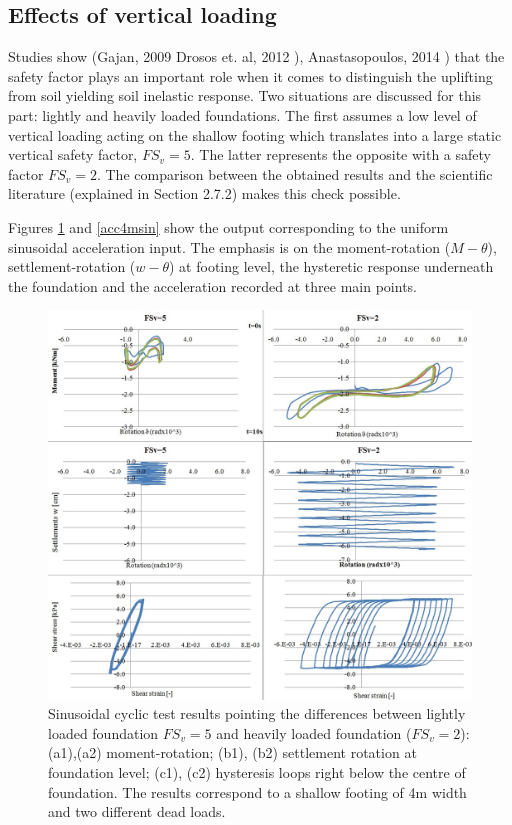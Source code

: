 \subsection{Effects of vertical loading}
Studies show (Gajan, 2009 \cite{gajan2009effects} Drosos et. al, 2012 \cite{drosos2012soil}), Anastasopoulos, 2014 \cite{anastasopoulos2014simplified}) that the safety factor plays an important role when it comes to distinguish the uplifting from soil yielding soil inelastic response. Two situations are discussed for this part: lightly and heavily loaded foundations. The first assumes a low level of vertical loading acting on the shallow footing which translates into a large static vertical safety factor, $FS_v=5$. The latter represents the opposite with a safety factor $FS_v=2.$ The comparison between the obtained results and the scientific literature (explained in Section 2.7.2) makes this check possible.

Figures \ref{sin} and \ref{acc4msin} show the output corresponding to the uniform sinusoidal \mbox{acceleration} input. The emphasis is on the moment-rotation ($M-\theta$), settlement-rotation ($w-\theta$) at footing level, the hysteretic response underneath the foundation and the acceleration recorded at three main points.

\begin{figure}
		\centering
		\includegraphics[width=0.7\linewidth]{"sin_4m"}
		\caption{Sinusoidal cyclic test results pointing the \mbox{differences} between lightly loaded foundation $FS_v=5$ and heavily loaded foundation ($FS_v=2$): (a1),(a2) moment-rotation; (b1), (b2) settlement rotation at foundation level; (c1), (c2) hysteresis loops right below the centre of foundation. The results correspond to a shallow footing of 4m width and two different dead loads.}
		\label{sin}
\end{figure}

